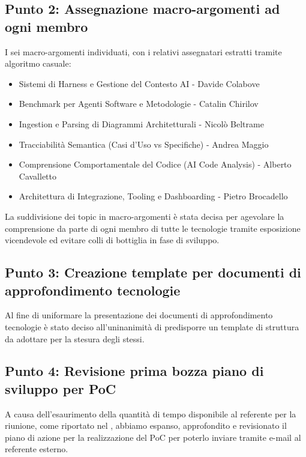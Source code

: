 \documentclass[a4paper, 11pt]{article}
\begin{document}
\subsection{Punto 2: Assegnazione macro-argomenti ad ogni membro}
I sei macro-argomenti individuati, con i relativi assegnatari estratti tramite algoritmo casuale:
\begin{itemize}
    \item Sistemi di Harness e Gestione del Contesto AI - Davide Colabove \vspace{-0.2cm}
    \item Benchmark per Agenti Software e Metodologie - Catalin Chirilov\vspace{-0.2cm}
    \item Ingestion e Parsing di Diagrammi Architetturali - Nicolò Beltrame\vspace{-0.2cm}
    \item Tracciabilità Semantica (Casi d'Uso vs Specifiche) - Andrea Maggio \vspace{-0.2cm}
    \item Comprensione Comportamentale del Codice (AI Code Analysis) - Alberto Cavalletto \vspace{-0.2cm}
    \item Architettura di Integrazione, Tooling e Dashboarding - Pietro Brocadello
\end{itemize}
La suddivisione dei topic in macro-argomenti è stata decisa per agevolare la comprensione da parte di ogni membro di tutte le tecnologie tramite esposizione vicendevole ed evitare colli di bottiglia in fase di sviluppo.
\subsection{Punto 3: Creazione template per documenti di approfondimento tecnologie}
Al fine di uniformare la presentazione dei documenti di approfondimento tecnologie è stato deciso all'uninanimità di predisporre un template di struttura da adottare per la stesura degli stessi.
\subsection{Punto 4: Revisione prima bozza piano di sviluppo per PoC}
A causa dell'esaurimento della quantità di tempo disponibile al referente per la riunione, come riportato nel , abbiamo espanso, approfondito e revisionato il piano di azione per la realizzazione del PoC per poterlo inviare tramite e-mail al referente esterno.
\end{document}
